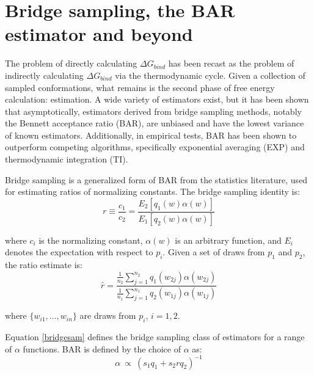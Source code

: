 \section{Bridge sampling, the BAR estimator and beyond}
\label{barsubsec}

The problem of directly calculating $\Delta G_{bind}$ has been recast as the problem of indirectly calculating $\Delta G_{bind}$ via the thermodynamic cycle. Given a collection of sampled conformations, what remains is the second phase of free energy calculation: estimation. A wide variety of estimators exist\cite{shirts2007alchemical,pohorille2010good,christ2010basic}, but it has been shown that asymptotically, estimators derived from bridge sampling methods, notably the Bennett acceptance ratio (BAR)\cite{bennett1976efficient}, are unbiased and have the lowest variance of known estimators\cite{shirts2007alchemical,shirts2003equilibrium,shirts2008statistically}. Additionally, in empirical tests, BAR has been shown to outperform competing algorithms, specifically exponential averaging (EXP) and thermodynamic integration (TI)\cite{shirts2005comparison}.

Bridge sampling is a generalized form of BAR from the statistics literature, used for estimating ratios of normalizing constants\cite{meng2002warp,gelman1998simulating,meng1996simulating}. The bridge sampling identity is:
\begin{equation} \label{bridgesamE}
r \equiv \frac{c_1}{c_2} = \frac{E_2[q_1(w)\alpha(w)]}{E_1[q_2(w)\alpha(w)]}
\end{equation}

\noindent where $c_i$ is the normalizing constant, $\alpha(w)$ is an arbitrary function, and $E_i$ denotes the expectation with respect to $p_i$. Given a set of draws from $p_1$ and $p_2$, the ratio estimate is:
\begin{equation} \label{bridgesam}
\hat{r}=\frac{\frac{1}{n_2}\sum_{j=1}^{n_2}q_1(w_{2j})\alpha(w_{2j})}{\frac{1}{n_1}\sum_{j=1}^{n_1}q_2(w_{1j})\alpha(w_{1j})}
\end{equation}

\noindent where $\{w_{i1}, ..., w_{in}\}$ are draws from $p_i$, $i=1,2$.

Equation \eqref{bridgesam} defines the bridge sampling class of estimators for a range of $\alpha$ functions. BAR is defined by the choice of $\alpha$ as: 
\begin{equation}
\alpha ~\propto~ (s_1 q_1+s_2 r q_2)^{-1}
\end{equation}


